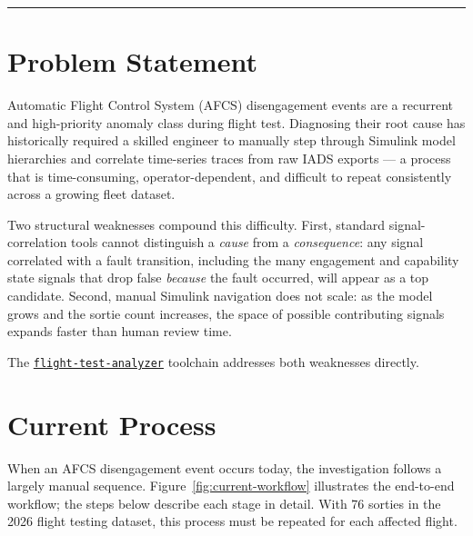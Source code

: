 \documentclass[11pt, letterpaper]{article}
\newcommand{\repoFTA}{\href{https://github.com/francis-barchesky/flight-test-analyzer}{\texttt{flight-test-analyzer}}}
\begin{document}
\vspace{0.8em}
\hrule
\vspace{1.5em}

\section{Problem Statement}

Automatic Flight Control System (AFCS) disengagement events are a recurrent
and high-priority anomaly class during flight test. Diagnosing their root cause
has historically required a skilled engineer to manually step through Simulink
model hierarchies and correlate time-series traces from raw IADS exports --- a
process that is time-consuming, operator-dependent, and difficult to repeat
consistently across a growing fleet dataset.

Two structural weaknesses compound this difficulty. First, standard
signal-correlation tools cannot distinguish a \emph{cause} from a
\emph{consequence}: any signal correlated with a fault transition, including the
many engagement and capability state signals that drop false \emph{because} the
fault occurred, will appear as a top candidate. Second, manual Simulink
navigation does not scale: as the model grows and the sortie count increases,
the space of possible contributing signals expands faster than human review
time.

The \repoFTA{} toolchain addresses both weaknesses directly.

\section{Current Process}

When an AFCS disengagement event occurs today, the investigation follows a
largely manual sequence. Figure~\ref{fig:current-workflow} illustrates the
end-to-end workflow; the steps below describe each stage in detail.
With 76 sorties in the 2026 flight testing dataset, this process must be
repeated for each affected flight.
\end{document}
